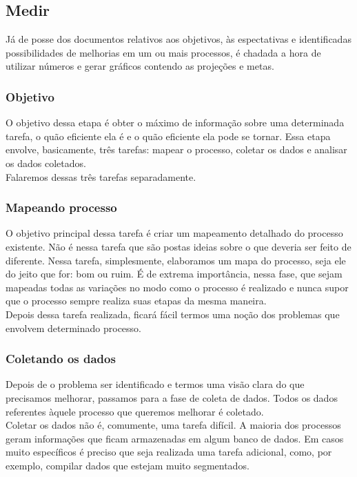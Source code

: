 \documentclass{abnt}
\begin{document}
				\subsection {Medir}
					Já de posse dos documentos relativos aos objetivos, às espectativas e identificadas 
					possibilidades de melhorias em um ou mais processos, é chadada a hora de utilizar números 
					e gerar gráficos contendo as projeções e metas.
					\subsubsection {Objetivo}
					O objetivo dessa etapa é obter o máximo de informação sobre uma determinada tarefa, 
					o quão eficiente ela é e o quão eficiente ela pode se tornar. Essa etapa envolve, 
					basicamente, três tarefas: mapear o processo, coletar os dados e analisar os dados coletados.
					\\
					Falaremos dessas três tarefas separadamente.
					\subsubsection {Mapeando processo}
					O objetivo principal dessa tarefa é criar um mapeamento detalhado do processo existente.
					Não é nessa tarefa que são postas ideias sobre o que deveria ser feito de diferente. 
					Nessa tarefa, simplesmente, elaboramos um mapa do processo, seja ele do jeito que for: bom ou ruim.
					É de extrema importância, nessa fase, que sejam mapeadas todas as variações no modo como o processo é realizado e 
					nunca supor que o processo sempre realiza suas etapas da mesma maneira.
					\\
					Depois dessa tarefa realizada, ficará fácil termos uma noção dos problemas que envolvem determinado processo.
					\subsubsection {Coletando os dados}
					Depois de o problema ser identificado e termos uma visão clara do que precisamos melhorar, passamos para a 
					fase de coleta de dados. Todos os dados referentes àquele processo que queremos melhorar é coletado.
					\\
					Coletar os dados não é, comumente, uma tarefa difícil. A maioria dos processos geram informações que 
					ficam armazenadas em algum banco de dados. Em casos muito específicos é preciso que seja realizada uma 
					tarefa adicional, como, por exemplo, compilar dados que estejam muito segmentados.
					
\end{document}
